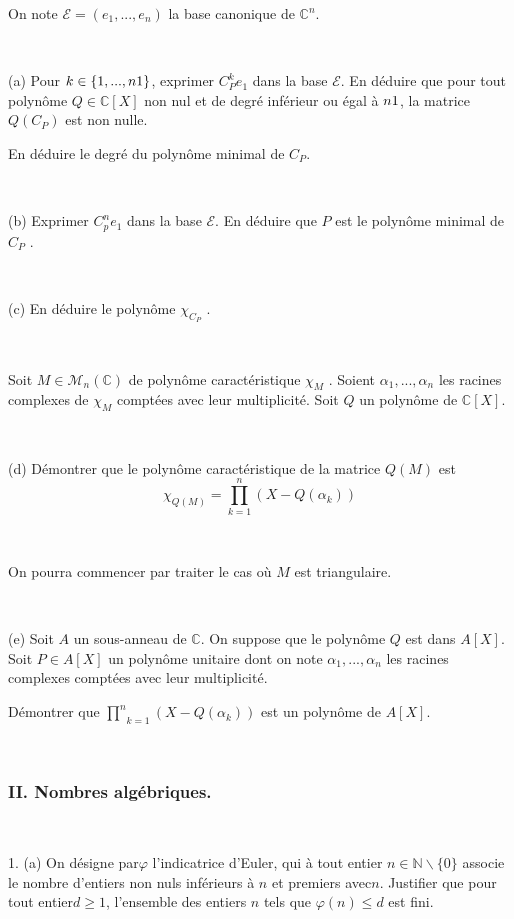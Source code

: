 On note $\mathcal{E}= (e_1, . . ., e_n)$ la base canonique de $\mathbb{C}^n$.

\

\quad (a) Pour $k \in \{1, . . ., n \nonconverted{minus} 1\}$, exprimer
$C_P^k e_1$ dans la base $\mathcal{E}$. En d{\'e}duire que pour tout
polyn{\^o}me $Q \in \mathbb{C}[X]$ non nul et de degr{\'e} inf{\'e}rieur ou
{\'e}gal {\`a} $n \nonconverted{minus} 1$, la matrice $Q (C_P)$ est non nulle.

\quad En d{\'e}duire le degr{\'e} du polyn{\^o}me minimal de $C_P$.

\

\quad (b) Exprimer $C^n_p e_1$ dans la base $\mathcal{E}$. En d{\'e}duire que
$P$ est le polyn{\^o}me minimal de $C_P$ .

\

\quad (c) En d{\'e}duire le polyn{\^o}me $\chi_{C_P}$ .

\

Soit $M \in \mathcal{M}_n (\mathbb{C})$ de polyn{\^o}me caract{\'e}ristique
$\chi_M$ . Soient $\alpha_1, . . ., \alpha_n$ les racines complexes de
$\chi_M$ compt{\'e}es avec leur multiplicit{\'e}. Soit $Q$ un polyn{\^o}me de
$\mathbb{C}[X]$.

\

\quad (d) D{\'e}montrer que le polyn{\^o}me caract{\'e}ristique de la matrice
$Q (M)$ est
\[ \chi_{Q (M)} = \underset{k = 1}{\overset{n}{\prod}} (X - Q (\alpha_k)) \]


\

 On pourra commencer par traiter
le cas o{\`u} $M$ est triangulaire.

\

\quad (e) Soit $A$ un sous-anneau de $\mathbb{C}$. On suppose que le
polyn{\^o}me $Q$ est dans $A [X]$. Soit $P \in A [X]$ un polyn{\^o}me unitaire
dont on note $\alpha_1, . . ., \alpha_n$ les racines complexes compt{\'e}es
avec leur multiplicit{\'e}.

D{\'e}montrer que $\underset{k = 1}{\overset{n}{\prod}} (X - Q (\alpha_k))$
est un polyn{\^o}me de $A [X]$.

\

\subsubsection*{II. Nombres alg{\'e}briques.}

\

1. (a) On d{\'e}signe par$\varphi$ l'indicatrice d'Euler, qui {\`a} tout
entier $n \in \mathbb{N}\backslash\{0\}$ associe le nombre d'entiers non nuls
inf{\'e}rieurs {\`a} $n$ et premiers avec$n$. Justifier que pour tout entier$d
\geqslant 1$, l'ensemble des entiers $n$ tels que $\varphi (n) \leqslant d$
est fini.

